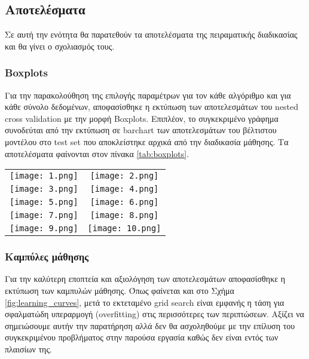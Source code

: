 \subsection{Αποτελέσματα}
Σε αυτή την ενότητα θα παρατεθούν τα αποτελέσματα της πειραματικής διαδικασίας και θα γίνει ο σχολιασμός τους.

\subsubsection{Boxplots}
Για την παρακολούθηση της επιλογής παραμέτρων για τον κάθε αλγόριθμο και για κάθε σύνολο δεδομένων, αποφασίσθηκε η εκτύπωση των αποτελεσμάτων του nested cross validation με την μορφή Boxplots. Επιπλέον, το συγκεκριμένο γράφημα συνοδεύται από την εκτύπωση σε barchart των αποτελεσμάτων του βέλτιστου μοντέλου στο test set που αποκλείστηκε αρχικά από την διαδικασία μάθησης. Τα αποτελέσματα φαίνονται στον πίνακα \ref{tab:boxplots}.

\begin{table*}
	\centering
	\caption{Αποτελέσματα από την εκπαίδευση των αλγορίθμων και από την αξιολόγησή τους στο test set του κάθε συνόλου δεδομένων.}
	\label{tab:boxplots}
	\begin{tabular}{cc}
		\texttt{[image: 1.png]} &
		\texttt{[image: 2.png]} 
		 \\ %
		\texttt{[image: 3.png]} &
		\texttt{[image: 4.png]} 
		 \\ %
		\texttt{[image: 5.png]} &
		\texttt{[image: 6.png]} 
		 \\ %
		\texttt{[image: 7.png]} &
		\texttt{[image: 8.png]} 
		 \\ %
		\texttt{[image: 9.png]} &
		\texttt{[image: 10.png]}
	\end{tabular}
\end{table*}





\subsubsection{Καμπύλες μάθησης}

Για την καλύτερη εποπτεία και αξιολόγηση των αποτελεσμάτων αποφασίσθηκε η εκτύπωση των καμπυλών μάθησης. Όπως φαίνεται και στο Σχήμα \ref{fig:learning_curves}, μετά το εκτεταμένο grid search είναι εμφανής η τάση για σφαλματώδη υπεραρμογή (overfitting) στις περισσότερες των περιπτώσεων. Αξίζει να σημειώσουμε αυτήν την παρατήρηση αλλά δεν θα ασχοληθούμε με την επίλυση του συγκεκριμένου προβλήματος στην παρούσα εργασία καθώς δεν είναι εντός των πλαισίων της.

